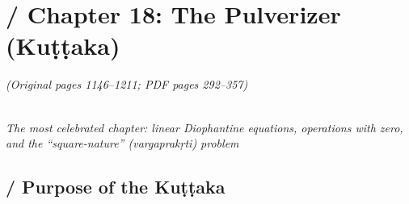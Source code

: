 \documentclass[10pt,a4paper]{article}
\begin{document}


\newpage

\section*{ / Chapter 18: The Pulverizer (Kuṭṭaka)}



\begin{center}

\textit{(Original pages 1146--1211; PDF pages 292--357)}

\\[0.3em]

\textit{The most celebrated chapter: linear Diophantine equations, operations with zero,\\

and the ``square-nature'' (vargaprakṛti) problem}

\end{center}



\longline



\subsection*{ / Purpose of the Kuṭṭaka}



\begin{minipage}[t]{0.47\textwidth}


\end{minipage}%

\hfill\vline\hfill%
\end{document}
